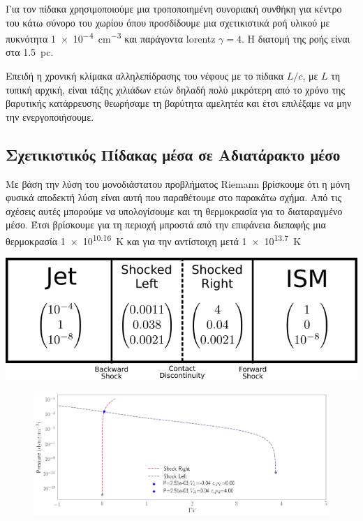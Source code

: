 	Για τον πίδακα χρησιμοποιούμε μια τροποποιημένη συνοριακή συνθήκη για κέντρο του κάτω σύνορο του χωρίου όπου προσδίδουμε μια σχετικιστικά ροή υλικού με πυκνότητα \SI{1e-4}{cm^{-3}} και παράγοντα lorentz $\gamma = 4$. Η διατομή της ροής είναι στα \SI{1.5}{pc}.
	
	Επειδή η χρονική κλίμακα αλληλεπίδρασης του νέφους με το πίδακα $L/c$, με $L$ τη τυπική αρχική, είναι τάξης χιλιάδων ετών δηλαδή πολύ μικρότερη από το χρόνο της βαρυτικής κατάρρευσης θεωρήσαμε τη βαρύτητα αμελητέα και έτσι επιλέξαμε να μην την ενεργοποιήσουμε.
	
	
\subsection{Σχετικιστικός Πίδακας μέσα σε Αδιατάρακτο μέσο}
	Με βάση την λύση του μονοδιάστατου προβλήματος Riemann βρίσκουμε ότι η μόνη φυσικά αποδεκτή λύση είναι αυτή που παραθέτουμε στο παρακάτω σχήμα. Από τις σχέσεις αυτές μπορούμε να υπολογίσουμε και τη θερμοκρασία για το διαταραγμένο μέσο. Έτσι βρίσκουμε για τη περιοχή μπροστά από την επιφάνεια διεπαφής  μια θερμοκρασία \SI{1e10.16}{K} και για την αντίστοιχη μετά \SI{1e13.7}{K}

\begin{marginfigure}
	\centering
	\includegraphics[width=1\linewidth]{Images/shock-shock}
	\caption{}
	\label{fig:shock-shock}
\end{marginfigure}

\begin{figure}[h]
	\centering
	\includegraphics[width=1\linewidth]{DataImages/Shock-Shock}
	\caption{}
	\label{fig:shock-shockbl}
\end{figure}


